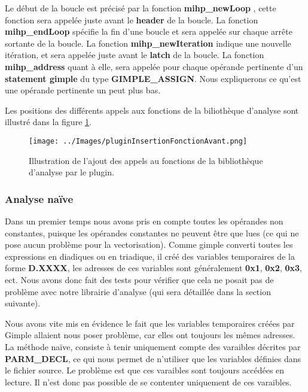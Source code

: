 \documentclass[12pt,french]{article}
\begin{document}
Le début de la boucle est précisé par la fonction
\textbf{mihp\_newLoop}
, cette fonction sera appelée juste avant le \textbf{header} de la boucle. La fonction \textbf{mihp\_endLoop} spécifie la fin d'une boucle et sera appelée sur chaque arrête sortante de la boucle. La fonction \textbf{mihp\_newIteration} indique une nouvelle itération, et sera appelée juste avant le
\textbf{latch} de la boucle. La fonction \textbf{mihp\_address} quant à elle, sera appelée pour chaque opérande pertinente d'un \textbf{statement gimple} du type \textbf{GIMPLE\_ASSIGN}. Nous expliquerons ce qu'est une opérande pertinente un peut plus bas. 

Les positions des différents appels aux fonctions de la biliothèque d'analyse sont illustré dans la figure \ref{DiagrammeAddFunction}.


\begin{figure}
	\begin{center}
		\texttt{[image: ../Images/pluginInsertionFonctionAvant.png]}
	\end{center}
	\caption{Illustration de l'ajout des appels au fonctions de la bibliothèque d'analyse par le plugin.}
	\label{DiagrammeAddFunction}
\end{figure}

		\subsubsection{\color{blue}Analyse naïve}

Dans un premier temps nous avons pris en compte toutes les opérandes non constantes, puisque les opérandes constantes ne peuvent être que lues (ce qui ne pose aucun problème pour la vectorisation). Comme gimple converti toutes les expressions en diadiques ou en triadique, il créé des variables temporaires de la forme \textbf{D.XXXX}, les adresses de ces variables sont généralement \textbf{0x1}, \textbf{0x2}, \textbf{0x3}, ect. Nous avons donc fait des tests pour vérifier que cela ne posait pas de problème avec notre librairie d'analyse (qui sera détaillée dans la section suivante).

Nous avons vite mis en évidence le fait que les variables temporaires créées par Gimple allaient nous poser problème, car elles ont toujours les mêmes adresses. La méthode naïve, consiste à tenir uniquement compte des varaibles décrites par \textbf{PARM\_DECL}, ce qui nous permet de n'utiliser que les variables définies dans le fichier source. Le problème est que ces varaibles sont toujours accédées en lecture. Il n'est donc pas possible de se contenter uniquement de ces varaibles.
\end{document}
